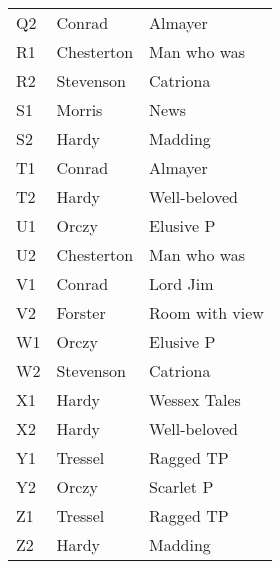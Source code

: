\begin{table}
\begin{tabular}{|l|l|l|}
    Q2 & Conrad & Almayer \\
    R1 & Chesterton & Man who was \\
    R2 & Stevenson & Catriona \\
    S1 & Morris & News \\
    S2 & Hardy & Madding \\
    T1 & Conrad & Almayer \\
    T2 & Hardy & Well-beloved \\
    U1 & Orczy & Elusive P \\
    U2 & Chesterton & Man who was \\
    V1 & Conrad & Lord Jim \\
    V2 & Forster & Room with view \\
    W1 & Orczy & Elusive P \\
    W2 & Stevenson & Catriona \\
    X1 & Hardy & Wessex Tales \\
    X2 & Hardy & Well-beloved \\
    Y1 & Tressel & Ragged TP \\
    Y2 & Orczy & Scarlet P \\
    Z1 & Tressel & Ragged TP \\
    Z2 & Hardy & Madding \\
    \hline
  \end{tabular}
\end{table}

